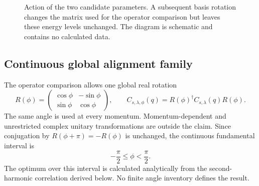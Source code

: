 \documentclass[11pt]{article}
\begin{document}
\begin{figure}[htbp]
\centering
{}
\caption{Action of the two candidate parameters. A subsequent basis rotation changes
the matrix used for the operator comparison but leaves these energy levels unchanged.
The diagram is schematic and contains no calculated data.}
\label{fig:candidate}
\end{figure}

\subsection{Continuous global alignment family}

The operator comparison allows one global real rotation
\begin{equation}
 R(\phi)=
 \begin{pmatrix}
 \cos\phi&-\sin\phi\\
 \sin\phi& \cos\phi
 \end{pmatrix},
 \qquad
 C_{s,\lambda,\phi}(q)
 =R(\phi)^\dagger C_{s,\lambda}(q)R(\phi).
 \label{eq:global-alignment}
\end{equation}
The same angle is used at every momentum. Momentum-dependent and unrestricted complex
unitary transformations are outside the claim. Since conjugation by
$R(\phi+\pi)=-R(\phi)$ is unchanged, the continuous fundamental interval is
\begin{equation}
 -\frac\pi2\le\phi<\frac\pi2.
 \label{eq:continuous-angle-domain}
\end{equation}
The optimum over this interval is calculated analytically from the second-harmonic
correlation derived below. No finite angle inventory defines the result.
\end{document}
